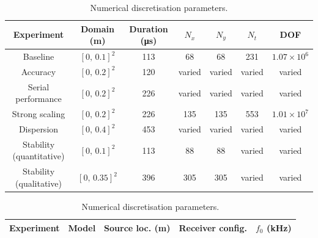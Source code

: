 \documentclass[final-report]{report-template}
\begin{document}
\begin{table}[!ht]
    \centering
    \begin{subtable}[t]{\textwidth}
        \centering
        \begin{tabular}{ccccccc}
            \toprule
            Experiment &
            Domain (m) &
            Duration (\si{\micro\second}) &
            $N_x$ &
            $N_y$ &
            $N_t$ &
            DOF \\
            \midrule
            Baseline & 
            $[0,\,0.1]^2$ &
            113 &
            68 &
            68 &
            231 &
            $1.07 \times 10^{6}$ \\
            
            Accuracy &
            $[0,\,0.2]^2$ &
            120 &
            varied &
            varied &
            varied &
            varied\\

            Serial performance & 
            $[0,\,0.2]^2$ &
            226 &
            varied &
            varied &
            varied & 
            varied \\

            Strong scaling & 
            $[0,\,0.2]^2$ &
            226 &
            135 &
            135 &
            553 &
            $1.01\times 10^{7}$\\

            Dispersion & 
            $[0,\,0.4]^2$ & 
            453 &
            varied & 
            varied & 
            varied & 
            varied \\

            Stability (quantitative) & 
            $[0,\, 0.1]^2$ & 
            113 &
            88 & 
            88 & 
            varied & 
            varied \\

            Stability (qualitative) & 
            $[0,\, 0.35]^2$ & 
            396 &
            305 & 
            305 & 
            varied & 
            varied \\

            \bottomrule
        \end{tabular}
        \caption{Numerical discretisation parameters.}
        \label{tab:parameters_numerical}
    \end{subtable}

    \vspace{1em}

    \begin{subtable}[!ht]{\textwidth}
        \centering
        \begin{tabular}{l p{} c m{} c
        }
            \toprule
            Experiment &
            Model &
            Source loc. (\si{\metre}) &
            Receiver config. &
            $f_0$ (\si{\kilo\hertz}) \\
            \midrule


\end{tabular}
\end{subtable}
\end{table}
\end{document}
